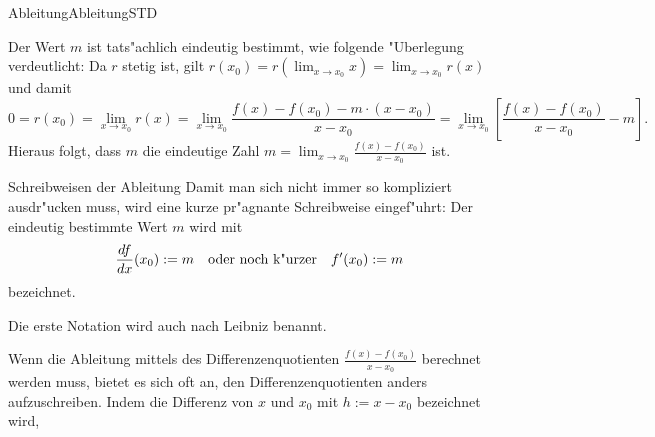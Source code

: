 \begin{MXContent}{Ableitung}{Ableitung}{STD}
\begin{center}
\begin{small}
\end{small}

\fi
\end{center}

Der Wert $m$ ist tats"achlich eindeutig bestimmt, wie folgende "Uberlegung 
verdeutlicht: Da $r$ stetig ist, gilt
$r(x_0) = r\left(\lim_{x \to x_0} x\right) = \lim_{x \to x_0} r(x)$ und damit
\[
0 = r(x_0) = \lim_{x \to x_0} r(x) %
 = \lim_{x \to x_0} \frac{f(x) - f(x_0) - m \cdot (x - x_0)}{x - x_0} %
 =  \lim_{x \to x_0} \left[\frac{f(x) - f(x_0)}{x - x_0} - m\right]. %
\]
Hieraus folgt, dass $m$ die eindeutige Zahl
$m = \displaystyle\lim_{x \to x_0} \frac{f(x) - f(x_0)}{x - x_0}$ ist.

\begin{MXInfo}{Schreibweisen der Ableitung}
Damit man sich nicht immer so kompliziert ausdr"ucken muss, wird eine kurze
pr"agnante Schreibweise eingef"uhrt:
Der eindeutig bestimmte Wert $m$ wird mit 
\[
\frac{\MD f}{\MD x}(x_0) := m \quad \text{oder noch k"urzer} \quad f'(x_0) := m %
\]
bezeichnet.

Die erste Notation wird auch nach Leibniz benannt.
\end{MXInfo}

Wenn die Ableitung mittels des 
Differenzenquotienten $\frac{f(x) - f(x_0)}{x - x_0}$ berechnet werden muss,
bietet es sich oft an, den Differenzenquotienten anders aufzuschreiben. Indem
die Differenz von $x$ und $x_0$ mit $h := x - x_0$ bezeichnet wird, 


\end{MXContent}
